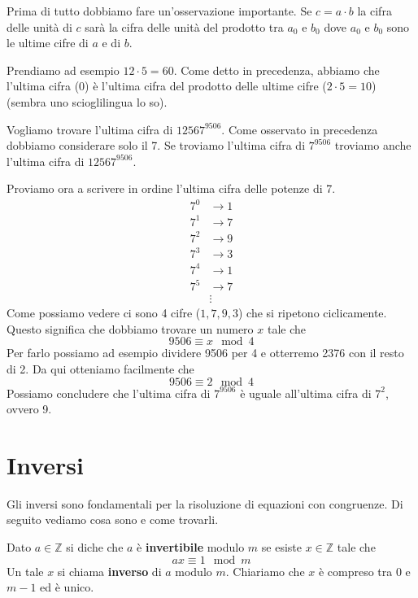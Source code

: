 Prima di tutto dobbiamo fare un'osservazione importante. Se $c = a \cdot b$ la cifra delle
unit\`a di $c$ sar\`a la cifra delle unit\`a del prodotto tra $a_0$ e $b_0$ dove $a_0$ e $b_0$
sono le ultime cifre di $a$ e di $b$.

\begin{example}
	Prendiamo ad esempio $12 \cdot 5 = 60$. Come detto in precedenza, abbiamo che l'ultima
	cifra (0) \`e l'ultima cifra del prodotto delle ultime cifre ($2 \cdot 5 = 10$)
	(sembra uno scioglilingua lo so).
\end{example}

\begin{example}
	Vogliamo trovare l'ultima cifra di $12567^{9506}$. Come osservato in precedenza dobbiamo
	considerare solo il 7. Se troviamo l'ultima cifra di $7^{9506}$ troviamo anche l'ultima
	cifra di $12567^{9506}$.

	Proviamo ora a scrivere in ordine l'ultima cifra delle potenze di 7.
	\begin{equation*}
		\begin{array}{rl}
			7^0 & \rightarrow 1 \\
			7^1 & \rightarrow 7 \\
			7^2 & \rightarrow 9 \\
			7^3 & \rightarrow 3 \\
			7^4 & \rightarrow 1 \\
			7^5 & \rightarrow 7 \\
			    & \vdots
		\end{array}
	\end{equation*}
	Come possiamo vedere ci sono 4 cifre ($1, 7, 9, 3$) che si ripetono ciclicamente. Questo
	significa che dobbiamo trovare un numero $x$ tale che
	\begin{equation*}
		9506 \equiv x \mod{4}
	\end{equation*}
	Per farlo possiamo ad esempio dividere 9506 per 4 e otterremo 2376 con il resto di 2.
	Da qui otteniamo facilmente che
	\begin{equation*}
		9506 \equiv 2 \mod{4}
	\end{equation*}
	Possiamo concludere che l'ultima cifra di $7^{9506}$ \`e uguale all'ultima cifra di
	$7^2$, ovvero 9.
\end{example}

\section{Inversi}
Gli inversi sono fondamentali per la risoluzione di equazioni con congruenze. Di seguito
vediamo cosa sono e come trovarli.
\begin{definition}
	Dato $a \in \mathbb{Z}$ si diche che $a$ \`e \textbf{invertibile} modulo $m$ se esiste
	$x \in \mathbb{Z}$ tale che
	\begin{equation*}
		ax \equiv 1 \mod{m}
	\end{equation*}
	Un tale $x$ si chiama \textbf{inverso} di $a$ modulo $m$. Chiariamo che $x$ \`e compreso
	tra 0 e $m - 1$ ed \`e unico.
\end{definition}

